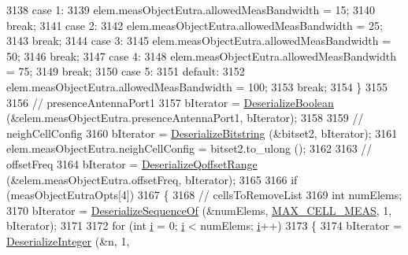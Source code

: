 \begin{DoxyCode}
3138                 \textcolor{keywordflow}{case} 1:
3139                   elem.measObjectEutra.allowedMeasBandwidth = 15;
3140                   \textcolor{keywordflow}{break};
3141                 \textcolor{keywordflow}{case} 2:
3142                   elem.measObjectEutra.allowedMeasBandwidth = 25;
3143                   \textcolor{keywordflow}{break};
3144                 \textcolor{keywordflow}{case} 3:
3145                   elem.measObjectEutra.allowedMeasBandwidth = 50;
3146                   \textcolor{keywordflow}{break};
3147                 \textcolor{keywordflow}{case} 4:
3148                   elem.measObjectEutra.allowedMeasBandwidth = 75;
3149                   \textcolor{keywordflow}{break};
3150                 \textcolor{keywordflow}{case} 5:
3151                 \textcolor{keywordflow}{default}:
3152                   elem.measObjectEutra.allowedMeasBandwidth = 100;
3153                   \textcolor{keywordflow}{break};
3154                 \}
3155 
3156               \textcolor{comment}{// presenceAntennaPort1}
3157               bIterator = \hyperlink{classns3_1_1Asn1Header_ab46f4b86988a0fbeb5df11a9bc46222d}{DeserializeBoolean} (&elem.measObjectEutra.presenceAntennaPort1,
       bIterator);
3158 
3159               \textcolor{comment}{// neighCellConfig}
3160               bIterator = \hyperlink{classns3_1_1Asn1Header_adb34498b05e8562fba5d40f49578968d}{DeserializeBitstring} (&bitset2, bIterator);
3161               elem.measObjectEutra.neighCellConfig = bitset2.to\_ulong ();
3162 
3163               \textcolor{comment}{// offsetFreq}
3164               bIterator = \hyperlink{classns3_1_1RrcAsn1Header_aca9c8488200eb19c7bc853225777c8df}{DeserializeQoffsetRange} (&elem.measObjectEutra.offsetFreq,
       bIterator);
3165 
3166               \textcolor{keywordflow}{if} (measObjectEutraOpts[4])
3167                 \{
3168                   \textcolor{comment}{// cellsToRemoveList}
3169                   \textcolor{keywordtype}{int} numElems;
3170                   bIterator = \hyperlink{classns3_1_1Asn1Header_a1a7245e05b482df8abade0a060bd0ecc}{DeserializeSequenceOf} (&numElems, 
      \hyperlink{lte-rrc-header_8cc_a1d57dacc17deb664f3250c8c9bc5ba0e}{MAX\_CELL\_MEAS}, 1, bIterator);
3171 
3172                   \textcolor{keywordflow}{for} (\textcolor{keywordtype}{int} \hyperlink{bernuolliDistribution_8m_a6f6ccfcf58b31cb6412107d9d5281426}{i} = 0; \hyperlink{bernuolliDistribution_8m_a6f6ccfcf58b31cb6412107d9d5281426}{i} < numElems; \hyperlink{bernuolliDistribution_8m_a6f6ccfcf58b31cb6412107d9d5281426}{i}++)
3173                     \{
3174                       bIterator = \hyperlink{classns3_1_1Asn1Header_a49802c9af30018b078150e866b6ecae2}{DeserializeInteger} (&n, 1, 

\end{DoxyCode}
